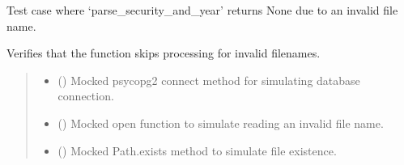 \documentclass[letterpaper,10pt,english]{sphinxmanual}
\begin{document}
\begin{fulllineitems}
\label{\detokenize{test.data_storage:test.data_storage.test_retry_failed_reports.test_invalid_filename_skipped}}
\pysigstartsignatures
\pysiglinewithargsret
{}
{\sphinxparamcomma {}\sphinxparamcomma {}}
{}
\pysigstopsignatures
\sphinxAtStartPar
Test case where ‘parse\_security\_and\_year’ returns None due to an invalid file name.

\sphinxAtStartPar
Verifies that the function skips processing for invalid filenames.
\begin{quote}\begin{description}
\begin{itemize}
\item {} 
\sphinxAtStartPar
{} () \textendash{} Mocked psycopg2 connect method for simulating database connection.

\item {} 
\sphinxAtStartPar
{} () \textendash{} Mocked open function to simulate reading an invalid file name.

\item {} 
\sphinxAtStartPar
{} () \textendash{} Mocked Path.exists method to simulate file existence.

\end{itemize}

\end{description}\end{quote}

\end{fulllineitems}

\end{document}
